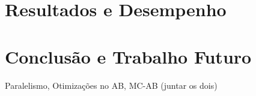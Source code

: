 \documentclass[12pt,a4paper,oneside]{article}
\begin{document}
\section{Resultados e Desempenho}
\label{sec:resdes}

\lipsum[1]

\lipsum[2]

\lipsum[3]


\section{Conclusão e Trabalho Futuro}
\label{sec:conc}

Paralelismo, Otimizações no AB, MC-AB (juntar os dois)\cite{Dutra:2015}

\lipsum[1]

\lipsum[2]



\end{document}
